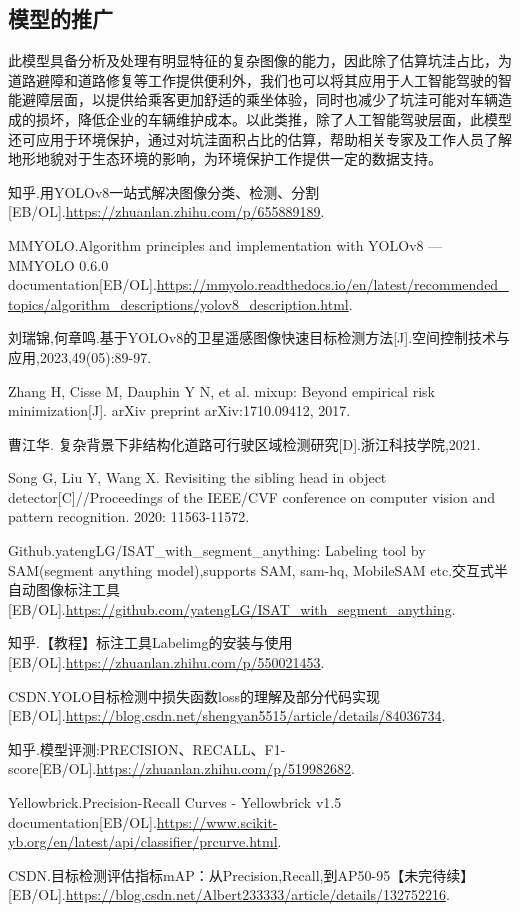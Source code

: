 \documentclass{MathorCupmodeling}
\begin{document}
	\subsection{模型的推广}
	此模型具备分析及处理有明显特征的复杂图像的能力，因此除了估算坑洼占比，为道路避障和道路修复等工作提供便利外，我们也可以将其应用于人工智能驾驶的智能避障层面，以提供给乘客更加舒适的乘坐体验，同时也减少了坑洼可能对车辆造成的损坏，降低企业的车辆维护成本。以此类推，除了人工智能驾驶层面，此模型还可应用于环境保护，通过对坑洼面积占比的估算，帮助相关专家及工作人员了解地形地貌对于生态环境的影响，为环境保护工作提供一定的数据支持。

	\newpage
	
	\begin{spacing}{1.08}
	\begin{thebibliography}{99}
	知乎.用YOLOv8一站式解决图像分类、检测、分割[EB/OL].\url{https://zhuanlan.zhihu.com/p/655889189}.

	MMYOLO.Algorithm principles and implementation with YOLOv8 — MMYOLO 0.6.0 documentation[EB/OL].\url{https://mmyolo.readthedocs.io/en/latest/recommended_topics/algorithm_descriptions/yolov8_description.html}.

	刘瑞锦,何章鸣.基于YOLOv8的卫星遥感图像快速目标检测方法[J].空间控制技术与应用,2023,49(05):89-97.

	Zhang H, Cisse M, Dauphin Y N, et al. mixup: Beyond empirical risk minimization[J]. arXiv preprint arXiv:1710.09412, 2017.

	曹江华. 复杂背景下非结构化道路可行驶区域检测研究[D].浙江科技学院,2021.

	Song G, Liu Y, Wang X. Revisiting the sibling head in object detector[C]//Proceedings of the IEEE/CVF conference on computer vision and pattern recognition. 2020: 11563-11572.

	Github.yatengLG/ISAT\_with\_segment\_anything: Labeling tool by SAM(segment anything model),supports SAM, sam-hq, MobileSAM etc.交互式半自动图像标注工具[EB/OL].\url{https://github.com/yatengLG/ISAT_with_segment_anything}.

	知乎.【教程】标注工具Labelimg的安装与使用[EB/OL].\url{https://zhuanlan.zhihu.com/p/550021453}.

	CSDN.YOLO目标检测中损失函数loss的理解及部分代码实现[EB/OL].\url{https://blog.csdn.net/shengyan5515/article/details/84036734}.

	知乎.模型评测:PRECISION、RECALL、F1-score[EB/OL].\url{https://zhuanlan.zhihu.com/p/519982682}.


	Yellowbrick.Precision-Recall Curves - Yellowbrick v1.5 documentation[EB/OL].\url{https://www.scikit-yb.org/en/latest/api/classifier/prcurve.html}.

	CSDN.目标检测评估指标mAP：从Precision,Recall,到AP50-95【未完待续】[EB/OL].\url{https://blog.csdn.net/Albert233333/article/details/132752216}.

	\end{thebibliography}
	\end{spacing}
	\newpage
\end{document}
